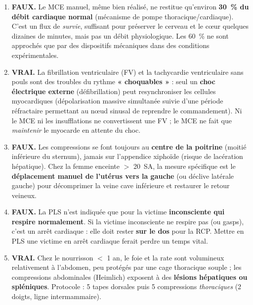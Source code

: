 \documentclass[11pt]{article}
\begin{document}
\begin{corrige}
\begin{enumerate}
    \item \textbf{FAUX.} Le MCE manuel, même bien réalisé, ne restitue qu'environ \textbf{\SI{30}{\%} du débit cardiaque normal} (mécanisme de pompe thoracique/cardiaque). C'est un flux de \emph{survie}, suffisant pour préserver le cerveau et le cœur quelques dizaines de minutes, mais pas un débit physiologique. Les \SI{60}{\%} ne sont approchés que par des dispositifs mécaniques dans des conditions expérimentales.
    \item \textbf{VRAI.} La fibrillation ventriculaire (FV) et la tachycardie ventriculaire sans pouls sont des troubles du rythme \textbf{« choquables »} : seul un \textbf{choc électrique externe} (défibrillation) peut resynchroniser les cellules myocardiques (dépolarisation massive simultanée suivie d'une période réfractaire permettant au nœud sinusal de reprendre le commandement). Ni le MCE ni les insufflations ne convertissent une FV ; le MCE ne fait que \emph{maintenir} le myocarde en attente du choc.
    \item \textbf{FAUX.} Les compressions se font toujours au \textbf{centre de la poitrine} (moitié inférieure du sternum), jamais sur l'appendice xiphoïde (risque de lacération hépatique). Chez la femme enceinte $>$ \SI{20}{SA}, la mesure spécifique est le \textbf{déplacement manuel de l'utérus vers la gauche} (ou déclive latérale gauche) pour décomprimer la veine cave inférieure et restaurer le retour veineux.
    \item \textbf{FAUX.} La PLS n'est indiquée que pour la victime \textbf{inconsciente qui respire normalement}. Si la victime inconsciente ne respire pas (ou gasps), c'est un arrêt cardiaque : elle doit rester \textbf{sur le dos} pour la RCP. Mettre en PLS une victime en arrêt cardiaque ferait perdre un temps vital.
    \item \textbf{VRAI.} Chez le nourrisson $<$ 1 an, le foie et la rate sont volumineux relativement à l'abdomen, peu protégés par une cage thoracique souple ; les compressions abdominales (Heimlich) exposent à des \textbf{lésions hépatiques ou spléniques}. Protocole : 5 tapes dorsales puis 5 compressions \emph{thoraciques} (2 doigts, ligne intermammaire).
\end{enumerate}
\end{corrige}
\end{document}
